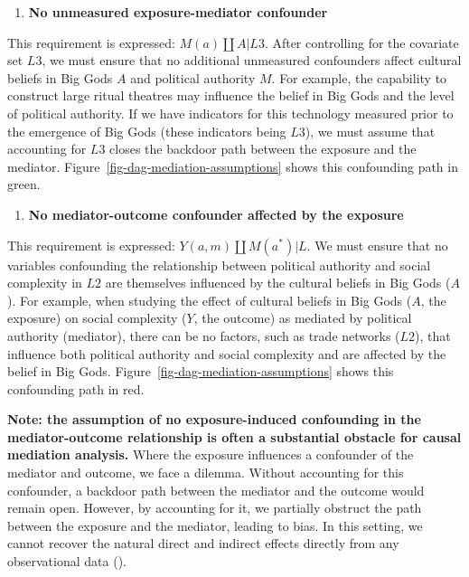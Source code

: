 \documentclass[
  singlecolumn,
  9pt]{article}
\providecommand{\tightlist}{%
  \setlength{\itemsep}{0pt}\setlength{\parskip}{0pt}}\usepackage{longtable,booktabs,array}
\begin{document}
\begin{enumerate}
\def\labelenumi{\arabic{enumi}.}
\setcounter{enumi}{2}
\tightlist
\item
  \textbf{No unmeasured exposure-mediator confounder}
\end{enumerate}

This requirement is expressed: \(M(a) \coprod A | L3\). After
controlling for the covariate set \(L3\), we must ensure that no
additional unmeasured confounders affect cultural beliefs in Big Gods
\(A\) and political authority \(M\). For example, the capability to
construct large ritual theatres may influence the belief in Big Gods and
the level of political authority. If we have indicators for this
technology measured prior to the emergence of Big Gods (these indicators
being \(L3\)), we must assume that accounting for \(L3\) closes the
backdoor path between the exposure and the mediator.
Figure~\ref{fig-dag-mediation-assumptions} shows this confounding path
in green.

\begin{enumerate}
\def\labelenumi{\arabic{enumi}.}
\setcounter{enumi}{3}
\tightlist
\item
  \textbf{No mediator-outcome confounder affected by the exposure}
\end{enumerate}

This requirement is expressed: \(Y(a,m) \coprod M(a^*) | L\). We must
ensure that no variables confounding the relationship between political
authority and social complexity in \(L2\) are themselves influenced by
the cultural beliefs in Big Gods (\(A\)). For example, when studying the
effect of cultural beliefs in Big Gods (\(A\), the exposure) on social
complexity (\(Y\), the outcome) as mediated by political authority
(mediator), there can be no factors, such as trade networks (\(L2\)),
that influence both political authority and social complexity and are
affected by the belief in Big Gods.
Figure~\ref{fig-dag-mediation-assumptions} shows this confounding path
in red.

\textbf{Note: the assumption of no exposure-induced confounding in the
mediator-outcome relationship is often a substantial obstacle for causal
mediation analysis.} Where the exposure influences a confounder of the
mediator and outcome, we face a dilemma. Without accounting for this
confounder, a backdoor path between the mediator and the outcome would
remain open. However, by accounting for it, we partially obstruct the
path between the exposure and the mediator, leading to bias. In this
setting, we cannot recover the natural direct and indirect effects
directly from any observational data
().
\end{document}
